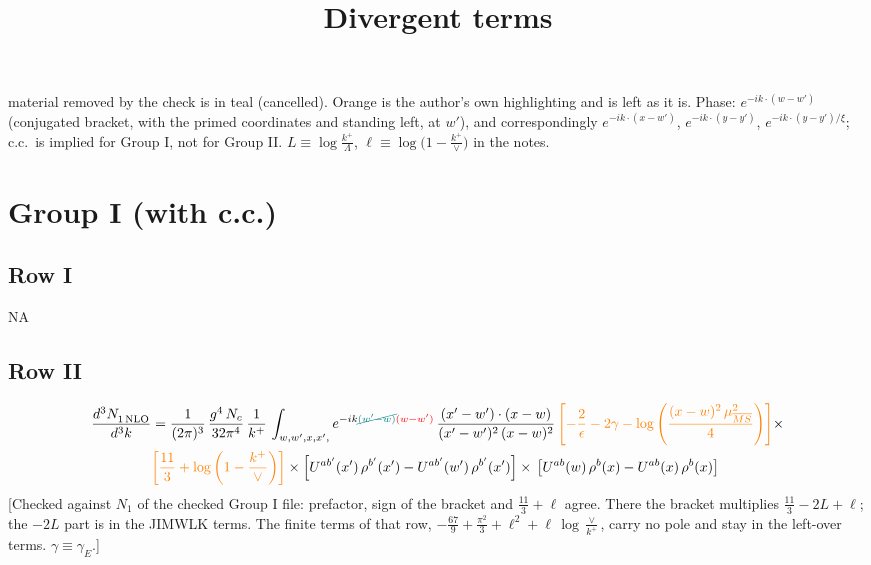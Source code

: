 \documentclass[9pt]{article}
\title{Divergent terms}
\author{}
\date{}
\numberwithin{equation}{section}
\begin{document}
\maketitle {} {\color{teal}material removed by the check is in teal (cancelled).} {\color{red}Orange is the author's own highlighting and is left as it is. Phase: $e^{-ik\cdot(w-w')}$ (conjugated bracket, with the primed coordinates and standing left, at $w'$), and correspondingly $e^{-ik\cdot(x-w')}$, $e^{-ik\cdot(y-y')}$, $e^{-ik\cdot(y-y')/\xi}$; c.c.\ is implied for Group I, not for Group II. $L\equiv\log\frac{k^{+}}{\Lambda}$, $\ell\equiv\log\big(1-\frac{k^{+}}{\vee}\big)$ in the notes.}\par
\section{Group I (with c.c.)}
\subsection{Row I}
\textsc{NA}
\subsection{Row II}
\begin{align}
     \frac{d^{3}N_{1\,\rm NLO}^{\rm}}{d^{3}k} &  =  \frac{1}{(2\pi)^{3}}\, \frac{g^{4}\,N_{c}}{32\pi^{4}}\,\frac{1}{k^{+}}\, \int_{w, w',x,x',} e^{-ik{\color{teal}\cancel{(w^\prime-w)}}{\color{red}(w-w^\prime)}}\, \frac{(x'-w')\cdot (x-w)}{(x'-w')^{2}\, (x-w)^{2}}\, {\color{orange}\left[-\frac{2}{\epsilon}-2\gamma-\log{\left(\frac{(x-w)^{2}\,\mu^{2}_{\overline{MS}}}{4}\right)}\right]}\times \notag \\ & {\color{orange}\left[\frac{11}{3}+\log{\left(1-\frac{k^{+}}{\vee}\right)}\right]}\times \left[U^{ab'}(x')\,\rho^{b'}(x') - U^{ab'}(w')\,\rho^{b'}(x')\right]\times\,\left[U^{ab}(w)\,\rho^{b}(x) - U^{ab}(x)\,\rho^{b}(x)\right]
\end{align} {\color{red}[Checked against $N_{1}$ of the checked Group I file: prefactor, sign of the bracket and $\frac{11}{3}+\ell$ agree. There the bracket multiplies $\frac{11}{3}-2L+\ell$; the $-2L$ part is in the JIMWLK terms. The finite terms of that row, $-\frac{67}{9}+\frac{\pi^{2}}{3}+\ell^{2}+\ell\,\log\frac{\vee}{k^{+}}$, carry no pole and stay in the left-over terms. $\gamma\equiv\gamma_{E}$.]}\par\noindent
\end{document}
